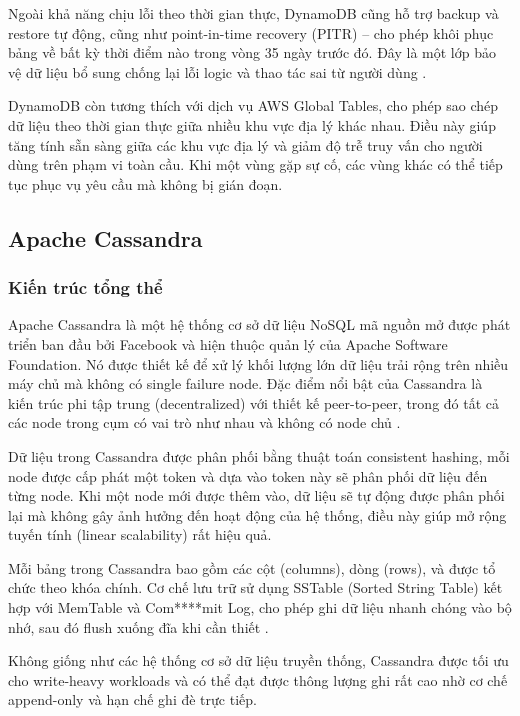\documentclass[conference]{IEEEtran}
\begin{document}
Ngoài khả năng chịu lỗi theo thời gian thực, DynamoDB cũng hỗ trợ backup và restore tự động, cũng như point-in-time recovery (PITR) – cho phép khôi phục bảng về bất kỳ thời điểm nào trong vòng 35 ngày trước đó. Đây là một lớp bảo vệ dữ liệu bổ sung chống lại lỗi logic và thao tác sai từ người dùng \cite{aws}.

DynamoDB còn tương thích với dịch vụ AWS Global Tables, cho phép sao chép dữ liệu theo thời gian thực giữa nhiều khu vực địa lý khác nhau. Điều này giúp tăng tính sẵn sàng giữa các khu vực địa lý và giảm độ trễ truy vấn cho người dùng trên phạm vi toàn cầu. Khi một vùng gặp sự cố, các vùng khác có thể tiếp tục phục vụ yêu cầu mà không bị gián đoạn.
\subsection{Apache Cassandra}
\subsubsection{Kiến trúc tổng thể}
Apache Cassandra là một hệ thống cơ sở dữ liệu NoSQL mã nguồn mở được phát triển ban đầu bởi Facebook và hiện thuộc quản lý của Apache Software Foundation. Nó được thiết kế để xử lý khối lượng lớn dữ liệu trải rộng trên nhiều máy chủ mà không có single failure node. Đặc điểm nổi bật của Cassandra là kiến trúc phi tập trung (decentralized) với thiết kế peer-to-peer, trong đó tất cả các node trong cụm có vai trò như nhau và không có node chủ \cite{cassandradocs}.

Dữ liệu trong Cassandra được phân phối bằng thuật toán consistent hashing, mỗi node được cấp phát một token và dựa vào token này sẽ phân phối dữ liệu đến từng node. Khi một node mới được thêm vào, dữ liệu sẽ tự động được phân phối lại mà không gây ảnh hưởng đến hoạt động của hệ thống, điều này giúp mở rộng tuyến tính (linear scalability) rất hiệu quả.

Mỗi bảng trong Cassandra bao gồm các cột (columns), dòng (rows), và được tổ chức theo khóa chính. Cơ chế lưu trữ sử dụng SSTable (Sorted String Table) kết hợp với MemTable và Com****mit Log, cho phép ghi dữ liệu nhanh chóng vào bộ nhớ, sau đó flush xuống đĩa khi cần thiết \cite{cassandradocs}.

Không giống như các hệ thống cơ sở dữ liệu truyền thống, Cassandra được tối ưu cho write-heavy workloads và có thể đạt được thông lượng ghi rất cao nhờ cơ chế append-only và hạn chế ghi đè trực tiếp.
\end{document}
